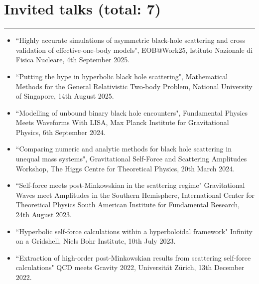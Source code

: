 \documentclass[10.5pt, oneside]{article}   	%
\begin{document}
  {\color{Sectioncolour}
\section*{Invited talks {\rm (total: 7)}}
\vspace{-3mm}
\noindent\rule{\linewidth}{0.6pt}}
\begin{itemize}
\item ``Highly accurate simulations of asymmetric black-hole scattering and cross validation of effective-one-body models", EOB@Work25, Istituto Nazionale di Fisica Nucleare, 4th September 2025.
\item ``Putting the hype in hyperbolic black hole scattering", Mathematical Methods for the General Relativistic Two-body Problem, National University of Singapore, 14th August 2025.
\item ``Modelling of unbound binary black hole encounters", Fundamental Physics Meets Waveforms With LISA, Max Planck Institute for Gravitational Physics, 6th September 2024.
\item ``Comparing numeric and analytic methods for black hole scattering in unequal mass systems", Gravitational Self-Force and Scattering Amplitudes Workshop, The Higgs Centre for Theoretical Physics, 20th March 2024.
\item ``Self-force meets post-Minkowskian in the scattering regime" Gravitational Waves meet Amplitudes in the Southern Hemisphere, International Center for Theoretical Physics South American Institute for Fundamental Research, 24th August 2023.
\item``Hyperbolic self-force calculations within a hyperboloidal framework" Infinity on a Gridshell, Niels Bohr Institute, 10th July 2023.
\item ``Extraction of high-order post-Minkowskian results from scattering self-force calculations" QCD meets Gravity 2022, Universität Zürich, 13th December 2022.
\end{itemize} 
\end{document}
